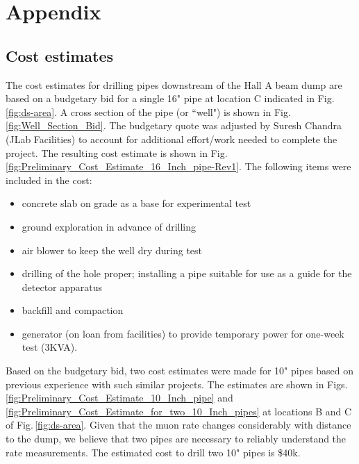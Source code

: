 \section{Appendix}
\label{sec:appx}
\subsection{Cost estimates}

The cost estimates for drilling pipes downstream of the Hall A beam dump are based on a budgetary bid for a single 16" pipe at location C indicated in 
Fig.\,\ref{fig:ds-area}. A cross section of the pipe (or ``well") is shown in Fig.\,\ref{fig:Well_Section_Bid}. 
The budgetary quote was adjusted by Suresh Chandra (JLab Facilities) to account for additional effort/work needed to complete the 
project. The resulting cost estimate is shown in Fig.\,\ref{fig:Preliminary_Cost_Estimate_16_Inch_pipe-Rev1}. The following
items were included in the cost:
\begin{itemize}
\item concrete slab on grade as a base for experimental test
\item ground exploration in advance of drilling
\item air blower to keep the well dry during test
\item drilling of the hole proper; installing a pipe suitable for use as a guide for the detector apparatus
\item backfill and compaction
\item generator (on loan from facilities) to provide temporary power for one-week test (3KVA).
\end{itemize}

Based on the budgetary bid, two cost estimates were made for 10" pipes based on previous experience with such similar projects. The estimates are shown in 
Figs.\ref{fig:Preliminary_Cost_Estimate_10_Inch_pipe} and \ref{fig:Preliminary_Cost_Estimate_for_two_10_Inch_pipes} at locations B and C of  Fig.\,\ref{fig:ds-area}.
Given that the muon rate changes considerably with
distance to the dump, we believe that two pipes are necessary to reliably understand the rate measurements. The estimated cost to drill two 10" pipes is \$40k. 

